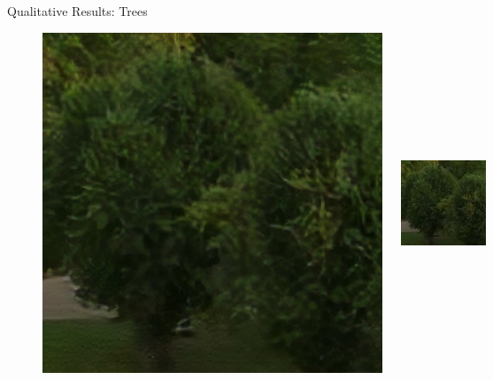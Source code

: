 \documentclass{beamer}
\begin{document}
\begin{frame}{Qualitative Results: Trees}
\begin{figure}
  \begin{columns}
      \includegraphics[width=0.6\linewidth]{static/trees_srunet.png}
      \includegraphics[width=0.15\linewidth]{static/trees_compressed.png}
  \end{columns}

  \vspace{0.5cm} %


\end{figure}
\end{frame}
\end{document}
